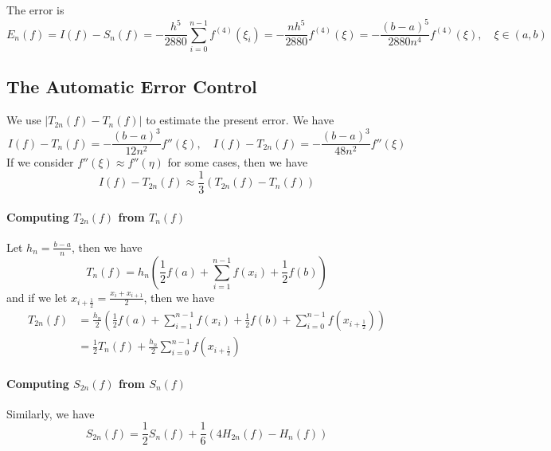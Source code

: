 \documentclass{matharticle}
\begin{document}
The error is
\begin{equation}
	E_n(f) = I(f) - S_n(f) = -\frac{h^5}{2880} \sum_{i=0}^{n-1} f^{(4)}(\xi_i) = -\frac{n h^5}{2880} f^{(4)}(\xi) = -\frac{(b - a)^5}{2880 n^4} f^{(4)}(\xi), \quad \xi \in (a, b)
\end{equation}

\subsection{The Automatic Error Control}
We use $|T_{2n}(f) - T_n(f)|$ to estimate the present error. We have
\begin{equation}
	I(f) - T_n(f) = -\frac{(b - a)^3}{12 n^2} f''(\xi), \quad I(f) - T_{2n}(f) = -\frac{(b - a)^3}{48 n^2} f''(\xi)
\end{equation}
If we consider $f''(\xi) \approx f''(\eta)$ for some cases, then we have
\begin{equation}
	I(f) - T_{2n}(f) \approx \frac{1}{3} (T_{2n}(f) - T_n(f))
\end{equation}

\paragraph{Computing $T_{2n}(f)$ from $T_n(f)$}
Let $h_n = \frac{b - a}{n}$, then we have
\begin{equation*}
	T_n(f) = h_n \left( \frac{1}{2} f(a) + \sum_{i=1}^{n-1} f(x_i) + \frac{1}{2} f(b) \right)
\end{equation*}
and if we let $x_{i+\frac{1}{2}} = \frac{x_i + x_{i+1}}{2}$, then we have
\begin{equation*}
	\begin{aligned}
		T_{2n}(f) & = \frac{h_n}{2} \left( \frac{1}{2} f(a) + \sum_{i=1}^{n-1} f(x_i) + \frac{1}{2} f(b) + \sum_{i=0}^{n-1} f(x_{i+\frac{1}{2}}) \right) \\
		          & = \frac{1}{2} T_n(f) + \frac{h_n}{2} \sum_{i=0}^{n-1} f(x_{i+\frac{1}{2}})
	\end{aligned}
\end{equation*}

\paragraph{Computing $S_{2n}(f)$ from $S_n(f)$}
Similarly, we have
\begin{equation}
	S_{2n}(f) = \frac{1}{2} S_n(f) + \frac{1}{6}(4H_{2n}(f) - H_n(f))
\end{equation}
\end{document}
